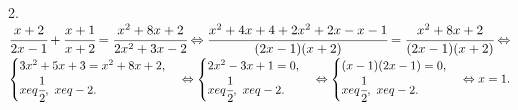 2. $\cfrac{x+2}{2x-1}+\cfrac{x+1}{x+2}=\cfrac{x^2+8x+2}{2x^2+3x-2}\Leftrightarrow \cfrac{x^2+4x+4+2x^2+2x-x-1}{(2x-1)(x+2)}=\cfrac{x^2+8x+2}{(2x-1)(x+2)}\Leftrightarrow$\\$
\begin{cases} 3x^2+5x+3=x^2+8x+2,\\ x
eq\cfrac{1}{2},\ x
eq-2.\end{cases}\Leftrightarrow
\begin{cases} 2x^2-3x+1=0,\\ x
eq\cfrac{1}{2},\ x
eq-2.\end{cases}\Leftrightarrow
\begin{cases} (x-1)(2x-1)=0,\\ x
eq\cfrac{1}{2},\ x
eq-2.\end{cases}\Leftrightarrow x=1.$\\
